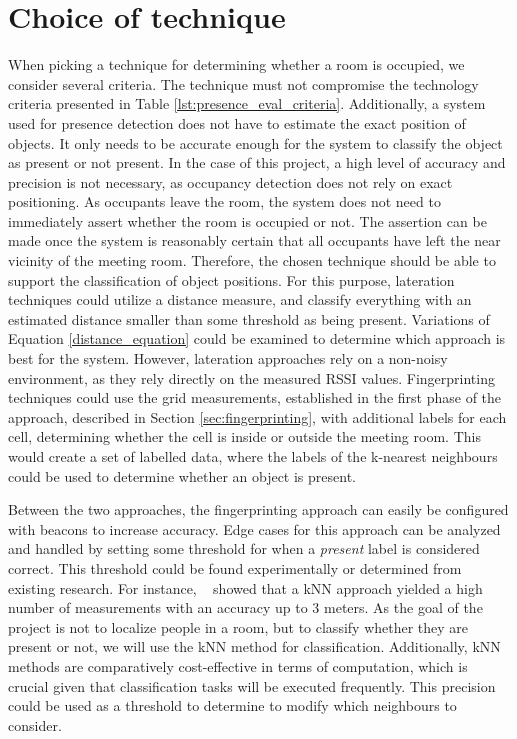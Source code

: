 \section{Choice of technique}\label{sec:ChoiceOfTechnique}
When picking a technique for determining whether a room is occupied, we consider several criteria.
The technique must not compromise the technology criteria presented in Table \ref{lst:presence_eval_criteria}.
Additionally, a system used for presence detection does not have to estimate the exact position of objects.
It only needs to be accurate enough for the system to classify the object as present or not present.
In the case of this project, a high level of accuracy and precision is not necessary, as occupancy detection does not rely on exact positioning.
As occupants leave the room, the system does not need to immediately assert whether the room is occupied or not.
The assertion can be made once the system is reasonably certain that all occupants have left the near vicinity of the meeting room.
Therefore, the chosen technique should be able to support the classification of object positions.  
For this purpose, lateration techniques could utilize a distance measure, and classify everything with an estimated distance smaller than some threshold as being present.
Variations of Equation \ref{distance_equation} could be examined to determine which approach is best for the system.
However, lateration approaches rely on a non-noisy environment, as they rely directly on the measured RSSI values.
Fingerprinting techniques could use the grid measurements, established in the first phase of the approach, described in Section \ref{sec:fingerprinting}, with additional labels for each cell, determining whether the cell is inside or outside the meeting room.
This would create a set of labelled data, where the labels of the k-nearest neighbours could be used to determine whether an object is present. 

Between the two approaches, the fingerprinting approach can easily be configured with beacons to increase accuracy.
Edge cases for this approach can be analyzed and handled by setting some threshold for when a \textit{present} label is considered correct. 
This threshold could be found experimentally or determined from existing research. 
For instance, \citeauthor{ble_kneares_neural}~\cite{ble_kneares_neural} showed that a kNN approach yielded a high number of measurements with an accuracy up to 3 meters.
As the goal of the project is not to localize people in a room, but to classify whether they are present or not, we will use the kNN method for classification.
Additionally, kNN methods are comparatively cost-effective in terms of computation, which is crucial given that classification tasks will be executed frequently.
This precision could be used as a threshold to determine to modify which neighbours to consider.    
